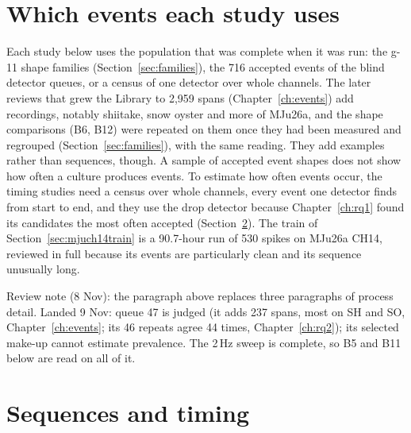 \section{Which events each study uses}

Each study below uses the population that was complete when it was run: the g-11 shape families (Section~\ref{sec:families}), the 716 accepted events of the blind detector queues, or a census of one detector over whole channels. The later reviews that grew the Library to 2,959 spans (Chapter~\ref{ch:events}) add recordings, notably shiitake, snow oyster and more of MJu26a, and the shape comparisons (B6, B12) were repeated on them once they had been measured and regrouped (Section~\ref{sec:families}), with the same reading. They add examples rather than sequences, though. A sample of accepted event shapes does not show how often a culture produces events. To estimate how often events occur, the timing studies need a census over whole channels, every event one detector finds from start to end, and they use the drop detector because Chapter~\ref{ch:rq1} found its candidates the most often accepted (Section~\ref{sec:rb_sequences}). The train of Section~\ref{sec:mjuch14train} is a 90.7-hour run of 530 spikes on MJu26a CH14, reviewed in full because its events are particularly clean and its sequence unusually long.

\begin{instructions}
Review note (8 Nov): the paragraph above replaces three paragraphs of process detail. Landed 9 Nov: queue 47 is
judged (it adds 237 spans, most on SH and SO, Chapter~\ref{ch:events}; its 46 repeats agree 44 times,
Chapter~\ref{ch:rq2}); its selected make-up cannot estimate prevalence. The 2\,Hz sweep is complete, so B5 and B11
below are read on all of it.
\end{instructions}

\section{Sequences and timing}
\label{sec:rb_sequences}


